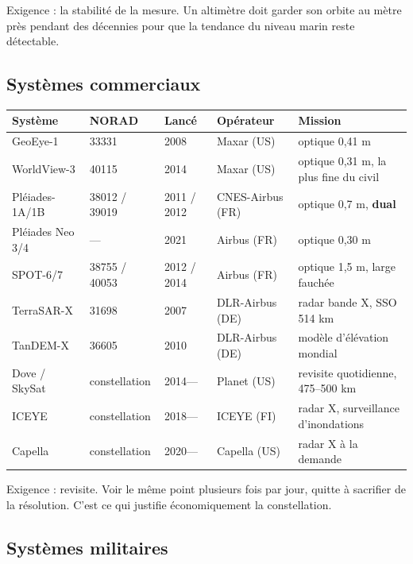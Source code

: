 \documentclass[11pt]{article}
\begin{document}
\noindent Exigence : la stabilité de la mesure. Un altimètre doit garder son orbite au mètre près pendant des décennies pour que la tendance du niveau marin reste détectable.

\subsection*{Systèmes commerciaux}

\begin{center}
\footnotesize\setlength{\tabcolsep}{4pt}
\begin{tabular}{lllll}
\toprule
Système & NORAD & Lancé & Opérateur & Mission \\
\midrule
GeoEye-1 & 33331 & 2008 & Maxar (US) & optique 0,41 m \\
WorldView-3 & 40115 & 2014 & Maxar (US) & optique 0,31 m, la plus fine du civil \\
Pléiades-1A/1B & 38012 / 39019 & 2011 / 2012 & CNES-Airbus (FR) & optique 0,7 m, \textbf{dual} \\
Pléiades Neo 3/4 & --- & 2021 & Airbus (FR) & optique 0,30 m \\
SPOT-6/7 & 38755 / 40053 & 2012 / 2014 & Airbus (FR) & optique 1,5 m, large fauchée \\
TerraSAR-X & 31698 & 2007 & DLR-Airbus (DE) & radar bande X, SSO 514 km \\
TanDEM-X & 36605 & 2010 & DLR-Airbus (DE) & modèle d'élévation mondial \\
Dove / SkySat & constellation & 2014--- & Planet (US) & revisite quotidienne, 475--500 km \\
ICEYE & constellation & 2018--- & ICEYE (FI) & radar X, surveillance d'inondations \\
Capella & constellation & 2020--- & Capella (US) & radar X à la demande \\
\bottomrule
\end{tabular}
\end{center}

\noindent Exigence : revisite. Voir le même point plusieurs fois par jour, quitte à sacrifier de la résolution. C'est ce qui justifie économiquement la constellation.

\subsection*{Systèmes militaires}
\end{document}
